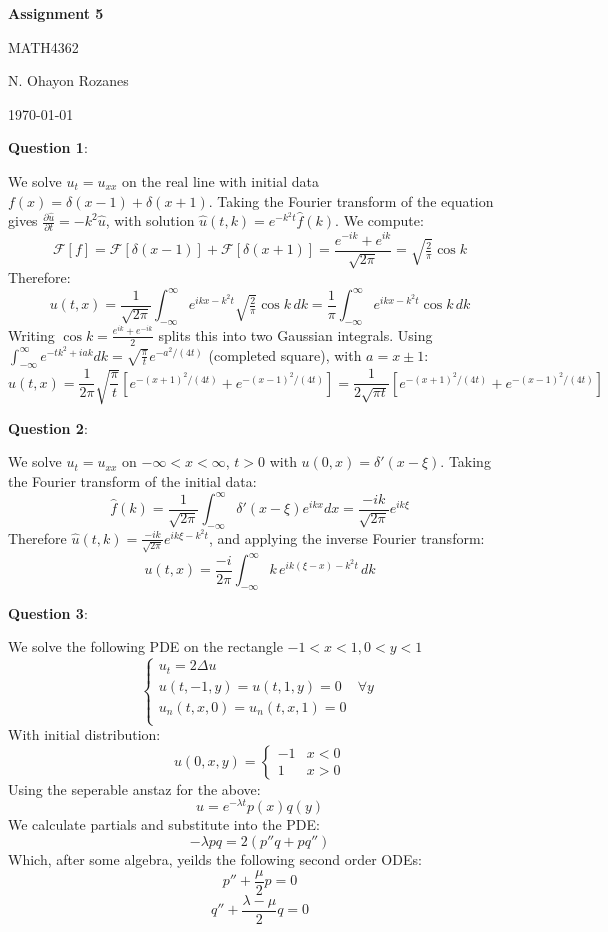 \documentclass{article} %
\newcommand{\question}[2][]{
  \begin{flushleft}
    \textbf{Question #1}: \textit{#2}

\end{flushleft}}
\newcommand{\maketitletwo}[1][]{
  \begin{center}
    \Large{\textbf{Assignment #1}

    MATH4362} %
    \vspace{5pt}

    \normalsize{N. Ohayon Rozanes %

    \today}        %
    \vspace{15pt}

\end{center}}
\begin{document}
\maketitletwo[5]  %

\question[1]{}
We solve $u_t = u_{xx}$ on the real line with initial data
$f(x) = \delta(x-1) + \delta(x+1)$.
Taking the Fourier transform of the equation gives
$\frac{\partial\hat{u}}{\partial t} = -k^2\hat{u}$,
with solution $\hat{u}(t,k) = e^{-k^2 t}\hat{f}(k)$. We compute:
\[
  \mathcal{F}[f] = \mathcal{F}[\delta(x-1)] + \mathcal{F}[\delta(x+1)]
  = \frac{e^{-ik} + e^{ik}}{\sqrt{2\pi}} = \sqrt{\tfrac{2}{\pi}}\cos k
\]
Therefore:
\[
  u(t,x) = \frac{1}{\sqrt{2\pi}}\int_{-\infty}^{\infty} e^{ikx-k^2t}
  \sqrt{\tfrac{2}{\pi}}\cos k\,dk
  = \frac{1}{\pi}\int_{-\infty}^{\infty} e^{ikx-k^2t}\cos k\,dk
\]
Writing $\cos k = \frac{e^{ik}+e^{-ik}}{2}$ splits this into two
Gaussian integrals.
Using $\int_{-\infty}^{\infty}e^{-tk^2+iak}dk =
\sqrt{\tfrac{\pi}{t}}e^{-a^2/(4t)}$
(completed square), with $a = x\pm 1$:
\[
  u(t,x) = \frac{1}{2\pi}\sqrt{\frac{\pi}{t}}\left[e^{-(x+1)^2/(4t)}
  + e^{-(x-1)^2/(4t)}\right]
  = \frac{1}{2\sqrt{\pi t}}\left[e^{-(x+1)^2/(4t)} + e^{-(x-1)^2/(4t)}\right]
\]

\question[2]{}
We solve $u_t = u_{xx}$ on $-\infty < x < \infty$, $t > 0$ with
$u(0,x) = \delta'(x-\xi)$. Taking the Fourier transform of the initial
data:
\[
  \hat{f}(k) =
  \frac{1}{\sqrt{2\pi}}\int_{-\infty}^{\infty}\delta'(x-\xi)e^{ikx}dx
  = \frac{-ik}{\sqrt{2\pi}}e^{ik\xi}
\]
Therefore $\hat{u}(t,k) = \frac{-ik}{\sqrt{2\pi}}e^{ik\xi-k^2t}$, and
applying the inverse Fourier transform:
\[
  u(t,x) = \frac{-i}{2\pi}\int_{-\infty}^{\infty} k\,e^{ik(\xi-x)-k^2t}\,dk
\]

\question[3]{}
We solve the following PDE on the rectangle $-1 < x < 1, 0 < y < 1$
\[
  \begin{cases}
    u_t = 2\Delta u\\
    u(t,-1, y) = u(t, 1, y) = 0 & \forall y \\
    u_n(t, x,0) = u_n(t,x, 1) = 0 \\
  \end{cases}
\]
With initial distribution:
\[
  u(0,x,y) =
  \begin{cases}
    -1 & x < 0 \\
    1 & x > 0
  \end{cases}
\]
Using the seperable anstaz for the above:
\[
  u = e^{-\lambda t}p(x)q(y)
\]
We calculate partials and substitute into the PDE:
\[
  -\lambda pq = 2(p''q + pq'')
\]
Which, after some algebra, yeilds the following second order ODEs:
\[
  p'' +  \frac{\mu}{2}p = 0
\]
\[
  q'' +  \frac{\lambda-\mu}{2}q = 0
\]
\end{document}
